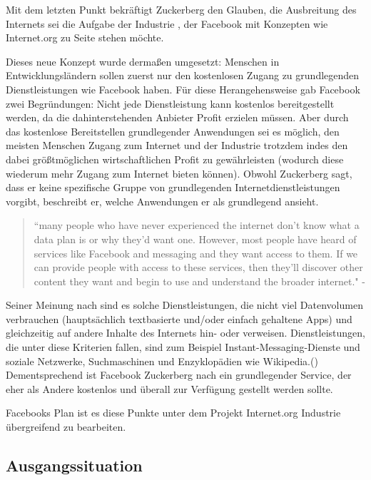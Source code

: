 \documentclass{article}
\begin{document}
\medskip

Mit dem letzten Punkt bekräftigt Zuckerberg den Glauben, die Ausbreitung des Internets sei die Aufgabe der Industrie , der Facebook mit Konzepten wie Internet.org zu Seite stehen möchte.

Dieses neue Konzept wurde dermaßen umgesetzt: Menschen in Entwicklungsländern sollen zuerst nur den kostenlosen Zugang zu grundlegenden Dienstleistungen wie Facebook haben.
Für diese Herangehensweise gab Facebook zwei Begründungen:
\medskip
Nicht jede Dienstleistung kann kostenlos bereitgestellt werden, da die dahinterstehenden Anbieter Profit erzielen müssen. 
Aber durch das kostenlose Bereitstellen grundlegender Anwendungen sei es möglich, den meisten Menschen Zugang zum Internet und der Industrie trotzdem indes den dabei größtmöglichen wirtschaftlichen Profit zu gewährleisten (wodurch diese wiederum mehr Zugang zum Internet bieten können).
Obwohl Zuckerberg sagt, dass er keine spezifische Gruppe von grundlegenden Internetdienstleistungen vorgibt, beschreibt er, welche Anwendungen er als grundlegend ansieht.

\begin{quote}
``many people who have never experienced the internet don’t know what a data plan is or why they’d want one. 
However, most people have heard of services like Facebook and messaging and they want access to them. If we can provide people 
with access to these services, then they’ll discover other content they want and begin to use 
and understand the broader internet." - \textcite[4]{HumanRight}
\end{quote}

Seiner Meinung nach sind es solche Dienstleistungen, die nicht viel Datenvolumen verbrauchen (hauptsächlich textbasierte und/oder einfach gehaltene Apps) und gleichzeitig auf andere Inhalte des Internets hin- oder verweisen.
Dienstleistungen, die unter diese Kriterien fallen, sind zum Beispiel Instant-Messaging-Dienste und soziale Netzwerke, Suchmaschinen und Enzyklopädien wie Wikipedia.(\cite[5]{HumanRight})
Dementsprechend ist Facebook Zuckerberg nach ein grundlegender Service, der eher als Andere kostenlos und überall zur Verfügung gestellt werden sollte.

\medskip

Facebooks Plan ist es diese Punkte unter dem Projekt Internet.org Industrie übergreifend zu bearbeiten.

\subsection{Ausgangssituation}
\end{document}
